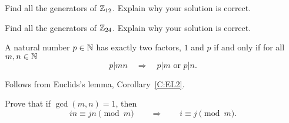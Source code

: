 \documentclass{ximera}
\begin{document}
\begin{exercise}
  Find all the generators of $\mathbb Z_{12}$. Explain why your solution is correct.
\end{exercise}


\begin{exercise}
  Find all the generators of $\mathbb Z_{24}$. Explain why your solution is correct.
\end{exercise}





\begin{corollary}\label{E:EL}
  A natural number $p\in \mathbb N$ has exactly two factors, $1$ and $p$ if
  and only if for all $m,n\in\mathbb N$
  \[
  p|mn \quad \Rightarrow \quad p|m \text{ or } p|n.
  \]
  \begin{sketch}
    Follows from Euclids's lemma, Corollary~\ref{C:EL2}.
  \end{sketch}
\end{corollary}


\begin{exercise} Prove that if $\gcd(m,n) = 1$, then 
\[
in \equiv jn \pmod m \qquad \Rightarrow\qquad i\equiv j\pmod m.
\]
\end{exercise}
\end{document}
